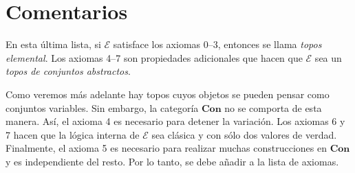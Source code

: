 \documentclass{article}
\newcommand{\topos}{\mathscr{E}}
\newcommand{\con}{\textbf{Con}}
\begin{document}
\section{Comentarios}
En esta última lista, si \(\topos\) satisface los axiomas 0--3, entonces se
llama \emph{topos elemental}. Los axiomas 4--7 son propiedades adicionales que
hacen que \(\topos\) sea un \emph{topos de conjuntos abstractos}.

Como veremos más adelante hay topos cuyos objetos se pueden pensar como
conjuntos variables. Sin embargo, la categoría \(\con\) no se comporta de esta
manera. Así, el axioma 4 es necesario para detener la variación. Los axiomas 6 y
7 hacen que la lógica interna de \(\topos\) sea clásica y con sólo dos valores
de verdad. Finalmente, el axioma 5 es necesario para realizar muchas
construcciones en \(\con\) y es independiente del resto. Por lo tanto, se debe
añadir a la lista de axiomas.
\end{document}
